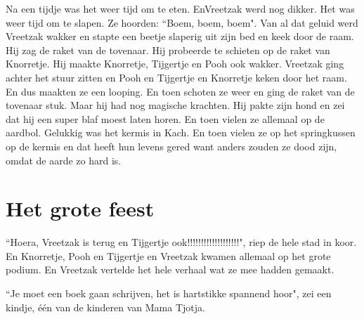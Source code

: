 \documentclass{article}
\begin{document}
Na een tijdje was het weer tijd om te eten. EnVreetzak werd nog dikker. Het was weer tijd om te slapen. Ze hoorden: ``Boem, boem, boem". Van al dat geluid werd Vreetzak wakker en stapte een beetje slaperig uit zijn bed en keek door de raam. Hij zag de raket van de tovenaar. Hij probeerde te schieten op de raket van Knorretje. Hij maakte Knorretje, Tijgertje en Pooh ook wakker. Vreetzak ging achter het stuur zitten en Pooh en Tijgertje en Knorretje keken door het raam. En dus maakten ze een looping. En toen schoten ze weer en ging de raket van de tovenaar stuk. Maar hij had nog magische krachten. Hij pakte zijn hond en zei dat hij een super blaf moest laten horen. En toen vielen ze allemaal op de aardbol. Gelukkig was het kermis in Kach. En toen vielen ze op het springkussen op de kermis en dat heeft hun levens gered want anders zouden ze dood zijn, omdat de aarde zo hard is.

\section{Het grote feest}

``Hoera, Vreetzak is terug en Tijgertje ook!!!!!!!!!!!!!!!!!!!", riep de hele stad in koor. En Knorretje, Pooh en Tijgertje en Vreetzak kwamen allemaal op het grote podium. En Vreetzak vertelde het hele verhaal wat ze mee hadden gemaakt.

``Je moet een boek gaan schrijven, het is hartstikke spannend hoor", zei een kindje, één van de kinderen van Mama Tjotja.
\end{document}
